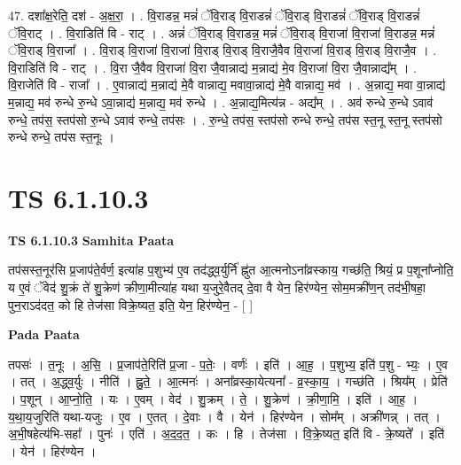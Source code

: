 \documentclass[17pt]{extarticle}
\begin{document}
47. दशा᳚क्ष॒रेति॒ दश॑ - अ॒क्ष॒रा॒ । . वि॒राडन्न॒ मन्नं॑ ॅवि॒राड् वि॒राडन्नं॑ ॅवि॒राड् वि॒राडन्नं॑ ॅवि॒राड् वि॒राडन्नं॑ ॅवि॒राट् । . वि॒राडिति॑ वि - राट् । . अन्नं॑ ॅवि॒राड् वि॒राडन्न॒ मन्नं॑ ॅवि॒राड् वि॒राजा॑ वि॒राजा॑ वि॒राडन्न॒ मन्नं॑ ॅवि॒राड् वि॒राजा᳚ । . वि॒राड् वि॒राजा॑ वि॒राजा॑ वि॒राड् वि॒राड् वि॒राजै॒वैव वि॒राजा॑ वि॒राड् वि॒राड् वि॒राजै॒व । . वि॒राडिति॑ वि - राट् । . वि॒रा जै॒वैव वि॒राजा॑ वि॒रा जै॒वान्नाद्य॑ म॒न्नाद्य॑ मे॒व वि॒राजा॑ वि॒रा जै॒वान्नाद्य᳚म् । . वि॒राजेति॑ वि - राजा᳚ । . ए॒वान्नाद्य॑ म॒न्नाद्य॑ मे॒वै वान्नाद्य॒ मवावा॒न्नाद्य॑ मे॒वै वान्नाद्य॒ मव॑ । . अ॒न्नाद्य॒ मवा वा॒न्नाद्य॑ म॒न्नाद्य॒ मव॑ रुन्धे रु॒न्धे ऽवा॒न्नाद्य॑ म॒न्नाद्य॒ मव॑ रुन्धे । . अ॒न्नाद्य॒मित्य॑न्न - अद्य᳚म् । . अव॑ रुन्धे रु॒न्धे ऽवाव॑ रुन्धे॒ तप॑स॒ स्तप॑सो रु॒न्धे ऽवाव॑ रुन्धे॒ तप॑सः । . रु॒न्धे॒ तप॑स॒ स्तप॑सो रुन्धे रुन्धे॒ तप॑स स्त॒नू स्त॒नू स्तप॑सो रुन्धे रुन्धे॒ तप॑स स्त॒नूः । \newline
\pagebreak
{}

\section{ TS 6.1.10.3 }

\textbf{TS 6.1.10.3 } \newline
\textbf{Samhita Paata} \newline

तप॑सस्त॒नूर॑सि प्र॒जाप॑ते॒र्वर्ण॒ इत्या॑ह प॒शुभ्य॑ ए॒व तद॑द्ध्व॒र्युर्नि॑ ह्नु॑त आ॒त्मनोऽना᳚व्रस्काय॒ गच्छ॑ति॒ श्रियं॒ प्र प॒शूना᳚प्नोति॒ य ए॒वं ॅवेद॑ शु॒क्रं ते॑ शु॒क्रेण॑ क्रीणा॒मीत्या॑ह यथा य॒जुरे॒वैतद् दे॒वा वै येन॒ हिर॑ण्येन॒ सोम॒मक्री॑ण॒न् तद॑भी॒षहा॒ पुन॒राऽद॑दत॒ को हि तेज॑सा विक्रे॒ष्यत॒ इति॒ येन॒ हिर॑ण्येन॒ - [  ] \newline

\textbf{Pada Paata} \newline

तपसः॑ । त॒नूः । अ॒सि॒ । प्र॒जाप॑ते॒रिति॑ प्र॒जा - प॒तेः॒ । वर्णः॑ । इति॑ । आ॒ह॒ । प॒शुभ्य॒ इति॑ प॒शु - भ्यः॒ । ए॒व । तत् । अ॒द्ध्व॒र्युः । नीति॑ । ह्नु॒ते॒ । आ॒त्मनः॑ । अना᳚व्रस्का॒येत्यना᳚ - व्र॒स्का॒य॒ । गच्छ॑ति । श्रिय᳚म् । प्रेति॑ । प॒शून् । आ॒प्नो॒ति॒ । यः । ए॒वम् । वेद॑ । शु॒क्रम् । ते॒ । शु॒क्रेण॑ । क्री॒णा॒मि॒ । इति॑ । आ॒ह॒ । य॒था॒य॒जुरिति॑ यथा-यजुः । ए॒व । ए॒तत् । दे॒वाः । वै । येन॑ । हिर॑ण्येन । सोम᳚म् । अक्री॑णन्न् । तत् । अ॒भी॒षहेत्य॑भि-सहा᳚ । पुनः॑ । एति॑ । अ॒द॒द॒त॒ । कः । हि । तेज॑सा । वि॒क्रे॒ष्यत॒ इति॑ वि - क्रे॒ष्यते᳚ । इति॑ । येन॑ । हिर॑ण्येन ।  \newline
\end{document}
